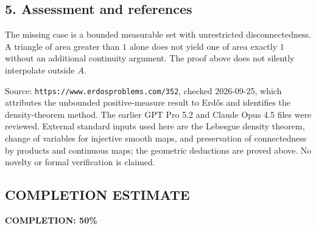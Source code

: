 \subsection*{5. Assessment and references}
The missing case is a bounded measurable set with unrestricted
disconnectedness. A triangle of area greater than $1$ alone does not
yield one of area exactly $1$ without an additional continuity
argument. The proof above does not silently interpolate outside $A$.

Source: \texttt{https://www.erdosproblems.com/352}, checked 2026-09-25,
which attributes the unbounded positive-measure result to Erd\H{o}s
and identifies the density-theorem method.
The earlier GPT Pro 5.2 and Claude Opus 4.5 files were reviewed.
External standard inputs used here are the Lebesgue density theorem,
change of variables for injective smooth maps, and preservation of
connectedness by products and continuous maps; the geometric deductions
are proved above. No novelty or formal verification is claimed.
\subsection*{COMPLETION ESTIMATE}
\textbf{COMPLETION: 50\%}
